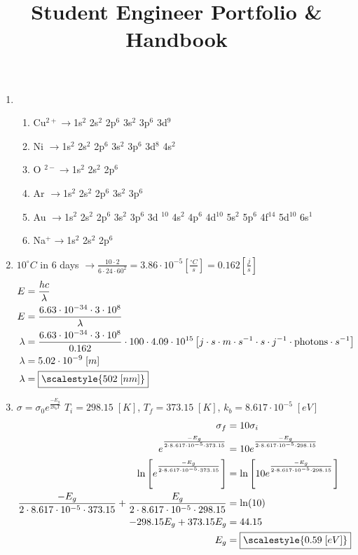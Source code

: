 \documentclass[11pt]{article}
\title{\textbf{Student Engineer Portfolio \& Handbook}}
\date{}
\newcommand{\scalemath}[1]%
{\mathchoice{\scalestyle{\displaystyle #1}}%
            {\scalestyle{\textstyle #1}}%
            {\scalestyle{\scriptstyle #1}}%
            {\scalestyle{\scriptscriptstyle #1}}%
}
\begin{document}
{\selectfont
\begin{enumerate}
    \item 
    \begin{enumerate}
        \item Cu$^{2+}\rightarrow$1s$^2$ 2s$^2$ 2p$^6$ 3s$^2$ 3p$^6$ 3d$^9$
        \item Ni $\rightarrow$1s$^2$ 2s$^2$ 2p$^6$ 3s$^2$ 3p$^6$ 3d$^8$ 4s$^2$
        \item O $^{2-}\rightarrow$1s$^2$ 2s$^2$ 2p$^6$
        \item Ar $\rightarrow$1s$^2$ 2s$^2$ 2p$^6$ 3s$^2$ 3p$^6$
        \item Au $\rightarrow$1s$^2$ 2s$^2$ 2p$^6$ 3s$^2$ 3p$^6$ 3d $^{10}$ 4s$^2$ 4p$^6$ 4d$^{10}$ 5s$^2$ 5p$^6$ 4f$^{14}$ 5d$^{10}$ 6s$^1$
        \item Na${^+}\rightarrow$1s$^2$ 2s$^2$ 2p$^6$ 
    \end{enumerate}
    
    \item $10^\circ C$ in 6 days $\rightarrow \frac{10\cdot2}{6\cdot24\cdot60^2}=3.86\cdot10^{-5}\left[\frac{^\circ C}{s}\right]=0.162\left[\frac{j}{s}\right]$ \\
    \begin{align*}
        E&=\frac{hc}{\lambda}\\
        E&=\frac{6.63\cdot10^{-34}\cdot3\cdot10^8}{\lambda}\\
        \lambda&=\frac{6.63\cdot10^{-34}\cdot3\cdot10^8}{0.162}\cdot100\cdot4.09\cdot10^{15}\left[j\cdot s\cdot m\cdot s^{-1}\cdot s\cdot j^{-1}\cdot\text{photons}\cdot s^{-1}\right]\\
        \lambda&=5.02\cdot10^{-9}\; [m]\\
        \lambda&=\fbox{$\displaystyle\scalemath{502\;[nm]}$}
    \end{align*}  
    
    \item $\sigma=\sigma_0e^{\frac{-E_g}{2k_bT}}$ $T_i=298.15\;[K]$, $T_f=373.15\;[K]$, $k_b=8.617\cdot10^{-5}\;[eV]$
    \begin{align*}
        \sigma_f&=10\sigma_i\\
        e^{^{\frac{-E_g}{2\cdot8.617\cdot10^{-5}\cdot373.15}}}&=10e^{^{\frac{-E_g}{2\cdot8.617\cdot10^{-5}\cdot298.15}}}\\
        \ln\left[e^{^{\frac{-E_g}{2\cdot8.617\cdot10^{-5}\cdot373.15}}}\right]&=\ln\left[10e^{^{\frac{-E_g}{2\cdot8.617\cdot10^{-5}\cdot298.15}}}\right]\\
        \frac{-E_g}{2\cdot8.617\cdot10^{-5}\cdot373.15}+\frac{E_g}{2\cdot8.617\cdot10^{-5}\cdot298.15}&=\ln(10)\\
        -298.15E_g+373.15E_g&=44.15\\
        E_g&=\fbox{$\displaystyle\scalemath{0.59\;[eV]}$}
    \end{align*} 
    

\end{enumerate}}
\end{document}
